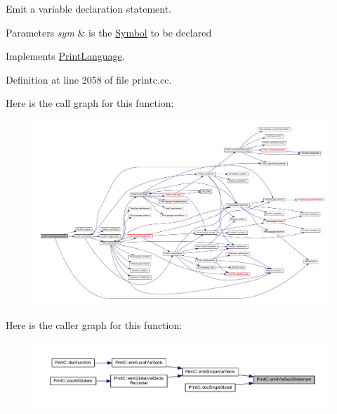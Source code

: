 Emit a variable declaration statement. 


\begin{DoxyParams}{Parameters}
{\em sym} & is the \mbox{\hyperlink{class_symbol}{Symbol}} to be declared \\
\hline
\end{DoxyParams}


Implements \mbox{\hyperlink{class_print_language_ab8d65e75ede43bc2f14b926bba89d7ae}{Print\+Language}}.



Definition at line 2058 of file printc.\+cc.

Here is the call graph for this function\+:
\nopagebreak
\begin{figure}[H]
\begin{center}
\leavevmode
\includegraphics[width=350pt]{class_print_c_a56fd9b353cd343909b2700fe42875885_cgraph}
\end{center}
\end{figure}
Here is the caller graph for this function\+:
\nopagebreak
\begin{figure}[H]
\begin{center}
\leavevmode
\includegraphics[width=350pt]{class_print_c_a56fd9b353cd343909b2700fe42875885_icgraph}
\end{center}
\end{figure}
\mbox{\label{class_print_c_af262dab8c2593fce9a9bceac82a8eb9c}} 
